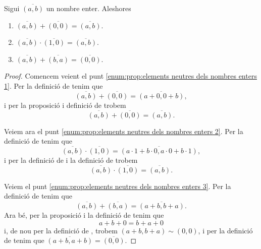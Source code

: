 \documentclass[../Apunts.tex]{subfiles}
\begin{document}
	\begin{proposition}
		\label{prop:elements neutres dels nombres enters}
		\label{prop:Z és un grup}\label{prop:Z és un anell}
		Sigui \(\overline{(a,b)}\) un nombre enter. Aleshores
		\begin{enumerate}
			\item\label{enum:prop:elements neutres dels nombres enters 1} 
			\(\overline{(a,b)}+\overline{(0,0)}=\overline{(a,b)}\).
			\item\label{enum:prop:elements neutres dels nombres enters 2} 
			\(\overline{(a,b)}\cdot\overline{(1,0)}=\overline{(a,b)}\).
			\item\label{enum:prop:elements neutres dels nombres enters 3}
			\(\overline{(a,b)}+\overline{(b,a)}=\overline{(0,0)}\).
		\end{enumerate}
		\begin{proof}
			Comencem veient el punt \eqref{enum:prop:elements neutres dels nombres enters 1}. Per la definició de  tenim que
			\[\overline{(a,b)}+\overline{(0,0)}=\overline{(a+0,0+b)},\]
			i per la proposició  i definició de   trobem
			\[\overline{(a,b)}+\overline{(0,0)}=\overline{(a,b)}.\]
			
			Veiem ara el punt \eqref{enum:prop:elements neutres dels nombres enters 2}. Per la definició de  tenim que 
			\[\overline{(a,b)}\cdot\overline{(1,0)}=\overline{(a\cdot 1+b\cdot 0,a\cdot0+b\cdot1)},\]
			i per la definició de  i la definició de  trobem
			\[\overline{(a,b)}\cdot\overline{(1,0)}=\overline{(a,b)}.\]
			
			Veiem el punt \eqref{enum:prop:elements neutres dels nombres enters 3}. Per la definició de  tenim que
			\[\overline{(a,b)}+\overline{(b,a)}=\overline{(a+b,b+a)}.\]
			Ara bé, per la proposició  i la definició de  tenim que
			\[a+b+0=b+a+0\]
			i, de nou per la definició de , trobem \((a+b,b+a)\sim(0,0)\), i per la definició de  tenim que \(\overline{(a+b,a+b)}=\overline{(0,0)}\).
		\end{proof}
	\end{proposition}
\end{document}
